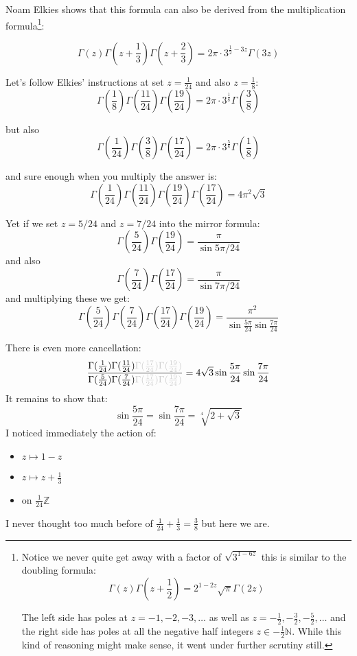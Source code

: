 \documentclass[12pt]{article}
\begin{document}
\newpage

\noindent Noam Elkies shows that this formula can also be derived from the multiplication formula\footnote{Notice we never quite get away with a factor of $\sqrt{3^{1-6z}}$ this is similar to the doubling formula:
$$ \Gamma(z) \Gamma(z + \frac{1}{2}) = 2^{1-2z} \sqrt{\pi}\Gamma(2z)$$


The left side has poles at $z = -1, -2, -3, \dots$ as well as $z = -\frac{1}{2},  -\frac{3}{2},  -\frac{5}{2}, \dots$ and the right side has poles at all the negative half integers $z \in - \frac{1}{2}\mathbb{N}$.  While this kind of reasoning might make sense, it went under further scrutiny still.}:

$$ \Gamma(z)  \Gamma(z + \frac{1}{3}) 
 \Gamma(z + \frac{2}{3})
 = 2\pi \cdot 3^{\frac{1}{2} - 3z} \Gamma(3z)
$$  \newpage

Let's follow Elkies' instructions at set $z = \frac{1}{24}$ and also $z = \frac{1}{8}$:
\vspace{20pt}
$$ \Gamma(\frac{1}{8})
\Gamma(\frac{11}{24}) \Gamma(\frac{19}{24})
= 2\pi \cdot 3^{\frac{1}{8}} \Gamma(\frac{3}{8})$$
\vspace{20pt}

\noindent but also
\vspace{20pt}
$$ \Gamma(\frac{1}{24})
\Gamma(\frac{3}{8}) \Gamma(\frac{17}{24})
= 2\pi \cdot 3^{\frac{5}{8}} \Gamma(\frac{1}{8})$$

\vspace{20pt}
\noindent and sure enough when you multiply the answer is:
\vspace{20pt}
$$ 
\Gamma(\frac{ 1}{24})
\Gamma(\frac{11}{24}) 
\Gamma(\frac{19}{24})
\Gamma(\frac{17}{24})
 = 4\pi^2 \sqrt{3}
$$

\newpage

\noindent Yet if we set $z = 5/24$ and $z = 7/24$ into the mirror formula:
$$ \Gamma(\frac{5}{24})
\Gamma(\frac{19}{24})
= \frac{\pi}{\sin 5\pi / 24}
$$
and also 
$$ \Gamma(\frac{7}{24})
\Gamma(\frac{17}{24})
= \frac{\pi}{\sin 7\pi / 24}
$$
and multiplying these we get:
$$ 
\Gamma(\frac{ 5}{24})
\Gamma(\frac{7}{24})
\Gamma(\frac{17}{24})
\Gamma(\frac{19}{24})
= 
\frac{\pi^2}{\sin \frac{5\pi}{24}
\sin \frac{7\pi}{24}}
 $$
 
\newpage
\noindent There is even more cancellation:
 $$
 \frac{\Gamma(\frac{ 1}{24})
\Gamma(\frac{11}{24}) 
{\color{black!20!white}{\Gamma(\frac{17}{24})
\Gamma(\frac{19}{24})}} }
{\Gamma(\frac{ 5}{24})
\Gamma(\frac{7}{24})
{\color{black!20!white}{\Gamma(\frac{17}{24})
\Gamma(\frac{19}{24})}}} 
 = 4 \sqrt{3} \sin \frac{5\pi}{24}
\sin \frac{7\pi}{24} $$
It remains to show that:
$$ \sin \frac{5 \pi}{24} = 
\sin \frac{7 \pi}{24}
= \sqrt[4]{2 + \sqrt{3}} $$
I noticed immediately the action of:
\begin{itemize}
\item $z \mapsto 1 - z$
\item $z \mapsto z + \frac{1}{3}$
\item on $\frac{1}{24}\mathbb{Z}$
\end{itemize}
I never thought too much before of $\boxed{\frac{1}{24} + \frac{1}{3} = \frac{3}{8}}$ but here we are.
\end{document}
